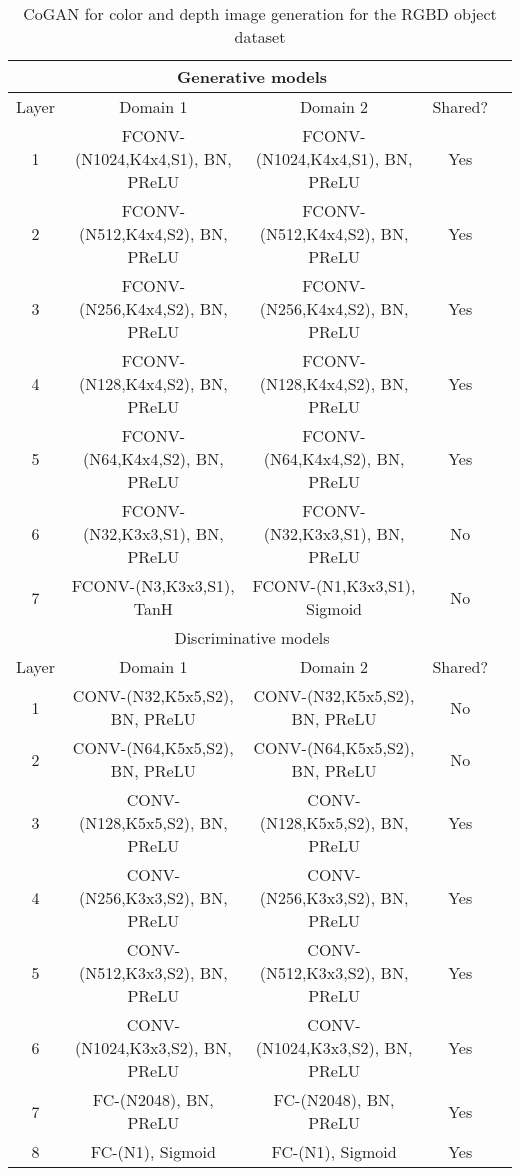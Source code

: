 \documentclass{article}
\begin{document}
\begin{table*}[thb!]
\small
\centering
{
\caption{CoGAN for color and depth image generation for the RGBD object dataset}
\label{tbl::rgbd_g}
\begin{tabular}{|c|c|c|c|c|}
\hline
\multicolumn{4}{|c|}{Generative models}\\
\hline\rule{0pt}{2ex}    
Layer &  Domain 1 & Domain 2 & Shared? \\
\hline 
1 &  FCONV-(N1024,K4x4,S1), BN, PReLU & FCONV-(N1024,K4x4,S1), BN, PReLU & Yes\\
2 &  FCONV-(N512,K4x4,S2), BN, PReLU & FCONV-(N512,K4x4,S2), BN, PReLU & Yes\\
3 &  FCONV-(N256,K4x4,S2), BN, PReLU & FCONV-(N256,K4x4,S2), BN, PReLU & Yes\\
4 &  FCONV-(N128,K4x4,S2), BN, PReLU & FCONV-(N128,K4x4,S2), BN, PReLU & Yes\\
5 &  FCONV-(N64,K4x4,S2), BN, PReLU & FCONV-(N64,K4x4,S2), BN, PReLU & Yes\\
6 &  FCONV-(N32,K3x3,S1), BN, PReLU & FCONV-(N32,K3x3,S1), BN, PReLU & No\\
7 &  FCONV-(N3,K3x3,S1), TanH & FCONV-(N1,K3x3,S1), Sigmoid & No\\
\hline
\hline
\multicolumn{4}{|c|}{Discriminative models}\\
\hline\rule{0pt}{2ex} 
Layer &  Domain 1 & Domain 2 & Shared? \\
\hline
1 & CONV-(N32,K5x5,S2), BN, PReLU & CONV-(N32,K5x5,S2), BN, PReLU &No\\
2 & CONV-(N64,K5x5,S2), BN, PReLU & CONV-(N64,K5x5,S2), BN, PReLU &No\\
3 & CONV-(N128,K5x5,S2), BN, PReLU & CONV-(N128,K5x5,S2), BN, PReLU &Yes\\
4 & CONV-(N256,K3x3,S2), BN, PReLU & CONV-(N256,K3x3,S2), BN, PReLU &Yes\\
5 & CONV-(N512,K3x3,S2), BN, PReLU & CONV-(N512,K3x3,S2), BN, PReLU &Yes\\
6 & CONV-(N1024,K3x3,S2), BN, PReLU & CONV-(N1024,K3x3,S2), BN, PReLU &Yes\\
7 & FC-(N2048), BN, PReLU & FC-(N2048), BN, PReLU &Yes\\
8 & FC-(N1), Sigmoid & FC-(N1), Sigmoid &Yes\\
\hline
\end{tabular}
}
\end{table*}
\end{document}
